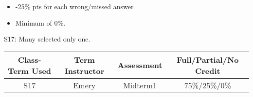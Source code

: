 \begin{rubric}

\begin{itemize}
	\item -25\% pts for each wrong/missed answer
	\item Minimum of 0\%.
\end{itemize}

\end{rubric}

\begin{outcomes}

S17: Many selected only one.

\begin{center}
	\begin{tabular}{cccc}
		\hline\hline
		Class-Term Used & Term Instructor & Assessment & Full/Partial/No Credit \\
		\hline
		S17 & Emery & Midterm1 & 75\%/25\%/0\%\\    %
		\hline
	\end{tabular}
\end{center}
\end{outcomes}

\begin{comments}

	
\end{comments}

